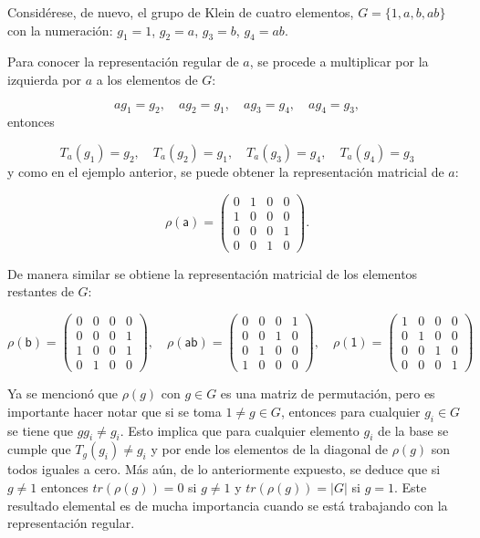 \begin{ejemplo}
Considérese, de nuevo, el grupo de Klein de cuatro elementos, $G = \{ 1, a, b, ab\}$ con la numeración: $g_1 = 1$, $g_2 = a$, $g_3 = b$, $g_4 = ab$.

Para conocer la representación regular de $a$, se procede a multiplicar por  la izquierda por $a$ a los elementos de $G$:

\[ ag_1 = g_2, \quad ag_2 = g_1, \quad ag_3 = g_4, \quad ag_4 = g_3, \] entonces 

\[ T_a(g_1) = g_2 , \quad T_a(g_2) = g_1, \quad T_a(g_3) = g_4, \quad T_a(g_4) = g_3 \] y como en el ejemplo anterior, se puede obtener la representación matricial de $a$:

\[  \mathsf{\rho(a)} = \begin{pmatrix}
0 & 1 & 0 & 0 \\
1 & 0 & 0 & 0 \\
0 & 0 & 0 & 1 \\
0 & 0 & 1 & 0
\end{pmatrix} .\]

De manera similar se obtiene la representación matricial de los elementos restantes de $G$:

\[ \mathsf{\rho(b)} = \begin{pmatrix}
0 & 0 & 0 & 0\\
0 & 0 & 0 & 1\\
1 & 0 & 0 & 1\\
0 & 1 & 0 & 0
\end{pmatrix}, \quad \mathsf{\rho(ab)} = \begin{pmatrix}
0 & 0 & 0 & 1\\
0 & 0 & 1 & 0\\
0 & 1 & 0 & 0\\
1 & 0 & 0 & 0
\end{pmatrix} , \quad \mathsf{\rho(1)} = \begin{pmatrix}
1 & 0 & 0 & 0\\
0 & 1 & 0 & 0 \\
0 & 0 & 1 & 0\\
0 & 0 & 0 & 1
\end{pmatrix} \]

\end{ejemplo}

\begin{nota}
Ya se mencionó que $\rho(g)$ con $g \in G$ es una matriz de permutación, pero es importante hacer notar que si se toma $ 1 \neq g \in G$, entonces para cualquier $g_i \in G$ se tiene que $ gg_i \neq g_i $. Esto implica que para cualquier elemento $g_i$ de la base se cumple que $T_g(g_i) \neq g_i$ y por ende los elementos de la diagonal de $\rho(g)$ son todos iguales a cero. Más aún, de lo anteriormente expuesto, se deduce que si $g \neq 1$ entonces $tr(\rho(g)) = 0$ si $g \neq 1$ y $tr(\rho(g)) = |G|$ si $g = 1$. Este resultado elemental es de mucha importancia cuando se está trabajando con la representación regular.
\end{nota}

